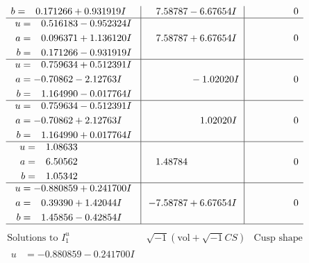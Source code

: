 \documentclass[1p]{elsarticle_modified}
\theoremstyle{definition}
\newcommand{\I}{\sqrt{-1}}
\begin{document}
$$\begin{array}{c|c|c}
\begin{aligned}
b &= \phantom{-}0.171266 + 0.931919 I\end{aligned}
 & \phantom{-}7.58787 - 6.67654 I & \phantom{-0.000000 } 0 \\ \hline\begin{aligned}
u &= \phantom{-}0.516183 - 0.952324 I \\
a &= \phantom{-}0.096371 + 1.136120 I \\
b &= \phantom{-}0.171266 - 0.931919 I\end{aligned}
 & \phantom{-}7.58787 + 6.67654 I & \phantom{-0.000000 } 0 \\ \hline\begin{aligned}
u &= \phantom{-}0.759634 + 0.512391 I \\
a &= -0.70862 - 2.12763 I \\
b &= \phantom{-}1.164990 - 0.017764 I\end{aligned}
 & \phantom{-0.000000 } -1.02020 I & \phantom{-0.000000 } 0 \\ \hline\begin{aligned}
u &= \phantom{-}0.759634 - 0.512391 I \\
a &= -0.70862 + 2.12763 I \\
b &= \phantom{-}1.164990 + 0.017764 I\end{aligned}
 & \phantom{-0.000000 -}1.02020 I & \phantom{-0.000000 } 0 \\ \hline\begin{aligned}
u &= \phantom{-}1.08633\phantom{ +0.000000I} \\
a &= \phantom{-}6.50562\phantom{ +0.000000I} \\
b &= \phantom{-}1.05342\phantom{ +0.000000I}\end{aligned}
 & \phantom{-}1.48784\phantom{ +0.000000I} & \phantom{-0.000000 } 0 \\ \hline\begin{aligned}
u &= -0.880859 + 0.241700 I \\
a &= \phantom{-}0.39390 + 1.42044 I \\
b &= \phantom{-}1.45856 - 0.42854 I\end{aligned}
 & -7.58787 + 6.67654 I & \phantom{-0.000000 } 0\\
 \hline 
 \end{array}$$\newpage$$\begin{array}{c|c|c}  
\text{Solutions to }I^u_{1}& \I (\text{vol} + \sqrt{-1}CS) & \text{Cusp shape}\\
 \hline 
\begin{aligned}
u &= -0.880859 - 0.241700 I \\

\end{aligned}
\end{array}$$
\end{document}
